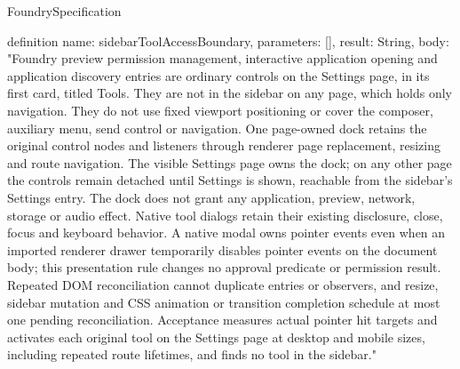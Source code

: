 \begin{lexlean}{FoundrySpecification}
\begin{semanticmodule}
definition{
  name: sidebarToolAccessBoundary,
  parameters: [],
  result: String,
  body: "Foundry preview permission management, interactive application opening and application discovery entries are ordinary controls on the Settings page, in its first card, titled Tools. They are not in the sidebar on any page, which holds only navigation. They do not use fixed viewport positioning or cover the composer, auxiliary menu, send control or navigation. One page-owned dock retains the original control nodes and listeners through renderer page replacement, resizing and route navigation. The visible Settings page owns the dock; on any other page the controls remain detached until Settings is shown, reachable from the sidebar's Settings entry. The dock does not grant any application, preview, network, storage or audio effect. Native tool dialogs retain their existing disclosure, close, focus and keyboard behavior. A native modal owns pointer events even when an imported renderer drawer temporarily disables pointer events on the document body; this presentation rule changes no approval predicate or permission result. Repeated DOM reconciliation cannot duplicate entries or observers, and resize, sidebar mutation and CSS animation or transition completion schedule at most one pending reconciliation. Acceptance measures actual pointer hit targets and activates each original tool on the Settings page at desktop and mobile sizes, including repeated route lifetimes, and finds no tool in the sidebar."
}


\end{semanticmodule}
\end{lexlean}
